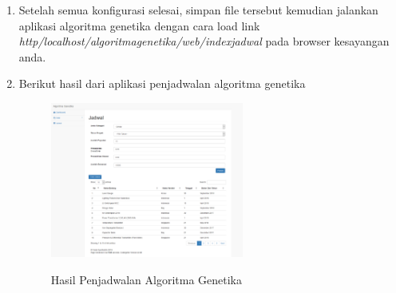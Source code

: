 \begin{enumerate}
\begin{enumerate}
    	\item Setelah semua konfigurasi selesai, simpan file tersebut kemudian jalankan aplikasi algoritma genetika dengan cara load link \textit{http/localhost/algoritmagenetika/web/indexjadwal} pada browser kesayangan anda.
    	
        \item Berikut hasil dari aplikasi penjadwalan algoritma genetika
    		\begin{figure}[!htbp]
        		\centering
        		\caption{Hasil Penjadwalan Algoritma Genetika}
        		\includegraphics[width=0.6\textwidth]{figures/GA15.png}
        		\label{GA15}
    		\end{figure}
        \end{enumerate}
\end{enumerate}
